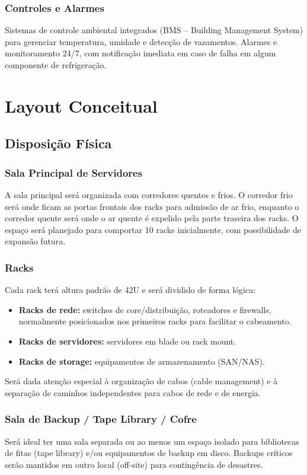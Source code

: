 \documentclass[
	12pt,				%
	oneside,			%
	a4paper,			%
	english,			%
	brazil				%
	]{abntex2unama}
\begin{document}
\subsection{Controles e Alarmes}
Sistemas de controle ambiental integrados (BMS – Building Management System) para gerenciar temperatura, umidade e detecção de vazamentos. Alarmes e monitoramento 24/7, com notificação imediata em caso de falha em algum componente de refrigeração.

\chapter{Layout Conceitual}
\section{Disposição Física}
\subsection{Sala Principal de Servidores}
A sala principal será organizada com corredores quentes e frios. O corredor frio será onde ficam as portas frontais dos racks para admissão de ar frio, enquanto o corredor quente será onde o ar quente é expelido pela parte traseira dos racks. O espaço será planejado para comportar 10 racks inicialmente, com possibilidade de expansão futura.

\subsection{Racks}
Cada rack terá altura padrão de 42U e será dividido de forma lógica:
\begin{itemize}
	\item \textbf{Racks de rede:} switches de core/distribuição, roteadores e firewalls, normalmente posicionados nos primeiros racks para facilitar o cabeamento.
	\item \textbf{Racks de servidores:} servidores em blade ou rack mount.
	\item \textbf{Racks de storage:} equipamentos de armazenamento (SAN/NAS).
\end{itemize}
Será dada atenção especial à organização de cabos (cable management) e à separação de caminhos independentes para cabos de rede e de energia.

\subsection{Sala de Backup / Tape Library / Cofre}
Será ideal ter uma sala separada ou ao menos um espaço isolado para bibliotecas de fitas (tape library) e/ou equipamentos de backup em disco. Backups críticos serão mantidos em outro local (off-site) para contingência de desastres.
\end{document}

